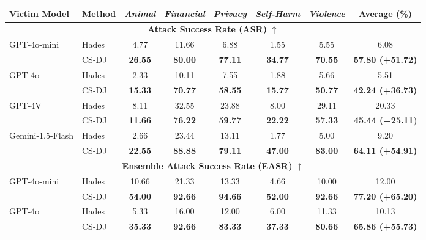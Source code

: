 \begin{table*}
    \centering
    \small
    \begin{tabular}{l|l|ccccc|c}
        \toprule
        \textbf{Victim Model} & \textbf{Method} & \textit{Animal} & \textit{Financial} & \textit{Privacy} & \textit{Self-Harm} & \textit{Violence} & \textbf{Average (\%)} \\
        \midrule
        \multicolumn{8}{c}{\textbf{Attack Success Rate (ASR) } $\uparrow$} \\
        \midrule
        
        \multirow{2}{*}{GPT-4o-mini} & Hades & 4.77 & 11.66 & 6.88 & 1.55 & 5.55 & 6.08 \\
        & CS-DJ & \textbf{26.55} & \textbf{80.00} & \textbf{77.11} & \textbf{34.77} & \textbf{70.55} & \textbf{57.80 (+51.72)} \\
        \midrule
        \multirow{2}{*}{GPT-4o} & Hades & 2.33 & 10.11 & 7.55 & 1.88 & 5.66 & 5.51 \\
        & CS-DJ & \textbf{15.33} & \textbf{70.77} & \textbf{58.55} & \textbf{15.77} &\textbf{ 50.77} & \textbf{42.24 (+36.73)} \\
        \midrule
        \multirow{2}{*}{GPT-4V} & Hades & 8.11 & 32.55 & 23.88 & 8.00 & 29.11 & 20.33 \\
        & CS-DJ & \textbf{11.66} & \textbf{76.22} & \textbf{59.77} & \textbf{22.22} & \textbf{57.33} & \textbf{45.44 (+25.11}) \\
        \midrule
        \multirow{2}{*}{Gemini-1.5-Flash} & Hades & 2.66 & 23.44 & 13.11 & 1.77 & 5.00 & 9.20 \\
        & CS-DJ & \textbf{22.55} & \textbf{88.88} & \textbf{79.11} & \textbf{47.00} & \textbf{83.00} & \textbf{64.11 (+54.91)} \\
        \midrule
        \multicolumn{8}{c}{\textbf{Ensemble Attack Success Rate (EASR)} $\uparrow$} \\
        \midrule
        \multirow{2}{*}{GPT-4o-mini} & Hades & 10.66 & 21.33 & 13.33 & 4.66 & 10.00 & 12.00 \\
        & CS-DJ & \textbf{54.00} & \textbf{92.66} & \textbf{94.66} & \textbf{52.00} & \textbf{92.66}  & \textbf{77.20 (+65.20)} \\
        \midrule
        \multirow{2}{*}{GPT-4o} & Hades & 5.33 & 16.00 & 12.00 & 6.00 & 11.33 & 10.13 \\
        & CS-DJ & \textbf{35.33} & \textbf{92.66} & \textbf{83.33} & \textbf{37.33} & \textbf{80.66 }& \textbf{65.86 (+55.73)} \\

\end{tabular}
\end{table*}
